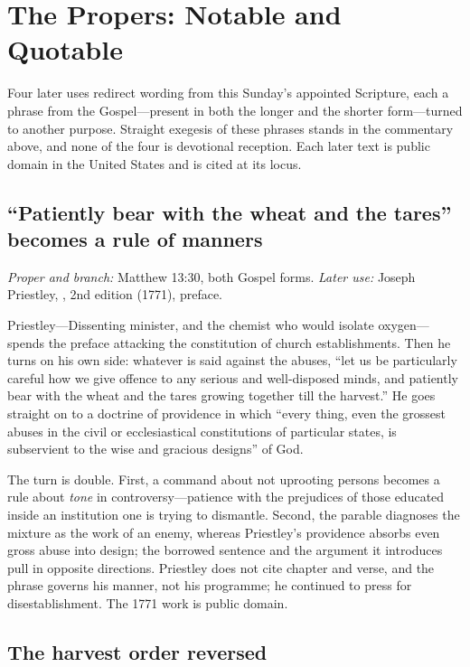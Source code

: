 \section*{The Propers: Notable and Quotable}

Four later uses redirect wording from this Sunday's appointed Scripture, each
a phrase from the Gospel---present in both the longer and the shorter
form---turned to another purpose. Straight exegesis of these phrases stands in
the commentary above, and none of the four is devotional reception. Each later
text is public domain in the United States and is cited at its locus.

\subsection*{``Patiently bear with the wheat and the tares'' becomes a rule of manners}

\emph{Proper and branch:} Matthew 13:30, both Gospel forms.
\emph{Later use:} Joseph Priestley, , 2nd edition (1771), preface.

Priestley---Dissenting minister, and the chemist who would isolate
oxygen---spends the preface attacking the constitution of church
establishments. Then he turns on his own side: whatever is said against the
abuses, ``let us be particularly careful how we give offence to any serious and
well-disposed minds, and patiently bear with the wheat and the tares growing
together till the harvest.'' He goes straight on to a doctrine of providence in
which ``every thing, even the grossest abuses in the civil or ecclesiastical
constitutions of particular states, is subservient to the wise and gracious
designs'' of God.

The turn is double. First, a command about not uprooting persons becomes a rule
about \emph{tone} in controversy---patience with the prejudices of those
educated inside an institution one is trying to dismantle. Second, the parable
diagnoses the mixture as the work of an enemy, whereas Priestley's providence
absorbs even gross abuse into design; the borrowed sentence and the argument it
introduces pull in opposite directions. Priestley does not cite chapter and
verse, and the phrase governs his manner, not his programme; he continued to
press for disestablishment. The 1771 work is public domain.

\subsection*{The harvest order reversed}

